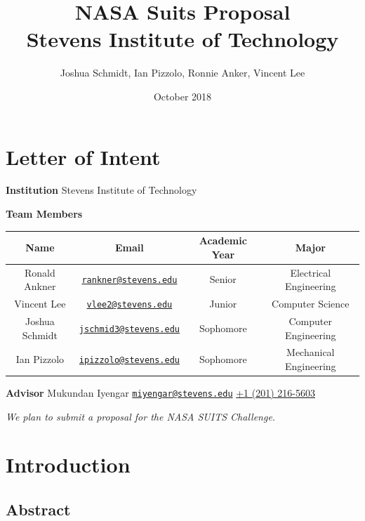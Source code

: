 \documentclass{article}
\title{%
	NASA Suits Proposal \\
	\large Stevens Institute of Technology}
\date{October 2018}
\author{Joshua Schmidt, Ian Pizzolo, Ronnie Anker, Vincent Lee}
\let\Oldsection\section
\renewcommand{\section}{\FloatBarrier\Oldsection}
\let\Oldsubsection\subsection
\renewcommand{\subsection}{\FloatBarrier\Oldsubsection}
\begin{document}
\maketitle

\tableofcontents

\section{Letter of Intent}



\begin{center}

\bigskip
\bigskip
\textbf{Institution}
Stevens Institute of Technology
\bigskip

\textbf{Team Members}
\bigskip
\bigskip
\begin{tabular}{||c c c c||} 
 \hline
 Name & Email & Academic Year & Major \\ [0.5ex] 
 \hline\hline
 Ronald Ankner & 
\href{mailto:rankner@stevens.edu}{\nolinkurl{rankner@stevens.edu}} & 
Senior & Electrical Engineering \\ 
 \hline
 Vincent Lee & 
\href{mailto:vlee2@stevens.edu}{\nolinkurl{vlee2@stevens.edu}} & Junior 
& Computer Science \\
 \hline
 Joshua Schmidt & 
\href{mailto:jschmid3@stevens.edu}{\nolinkurl{jschmid3@stevens.edu}} & 
Sophomore & Computer Engineering \\
 \hline
 Ian Pizzolo & 
\href{mailto:ipizzolo@stevens.edu}{\nolinkurl{ipizzolo@stevens.edu}} & 
Sophomore & Mechanical Engineering \\
 \hline
\end{tabular}

\bigskip
\bigskip

\textbf{Advisor}
\bigskip
Mukundan Iyengar\newline
\href{mailto:miyengar@stevens.edu}{\nolinkurl{miyengar@stevens.edu}}\newline
\href{tel:12012165603}{+1 (201) 216-5603}

\bigskip
\bigskip
\textit{We plan to submit a proposal for the NASA SUITS Challenge.}

\end{center}

\section{Introduction}

\subsection{Abstract}
\end{document}
